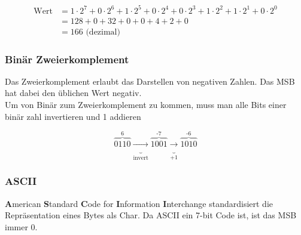 \[
\begin{aligned}
\text{Wert} &= 1 \cdot 2^7+0 \cdot 2^6+1 \cdot 2^5+0 \cdot 2^4+0 \cdot 2^3+1 \cdot 2^2+1 \cdot 2^1+0 \cdot 2^0 \\
&= 128 + 0 + 32 + 0 + 0 + 4 + 2 + 0 \\
&= 166 \text{ (dezimal)}
\end{aligned}
\]

\subsubsection{Binär Zweierkomplement}

Das Zweierkomplement erlaubt das Darstellen von negativen Zahlen. Das MSB hat dabei den üblichen Wert negativ.\\ 
Um von Binär zum Zweierkomplement zu kommen, muss man alle Bits einer binär zahl invertieren und 1 addieren

\[
\overbrace{0110}^\text{6} 
\underbrace{\rightarrow}_\text{invert}
\overbrace{1001}^\text{-7} 
\underbrace{\rightarrow}_{+1}
\overbrace{1010}^\text{-6} 
\]
\subsubsection{ASCII}

\textbf{A}merican \textbf{S}tandard \textbf{C}ode for \textbf{I}nformation \textbf{I}nterchange standardisiert die Repräsentation eines Bytes als Char. 
Da ASCII ein 7-bit Code ist, ist das MSB immer 0.\\

